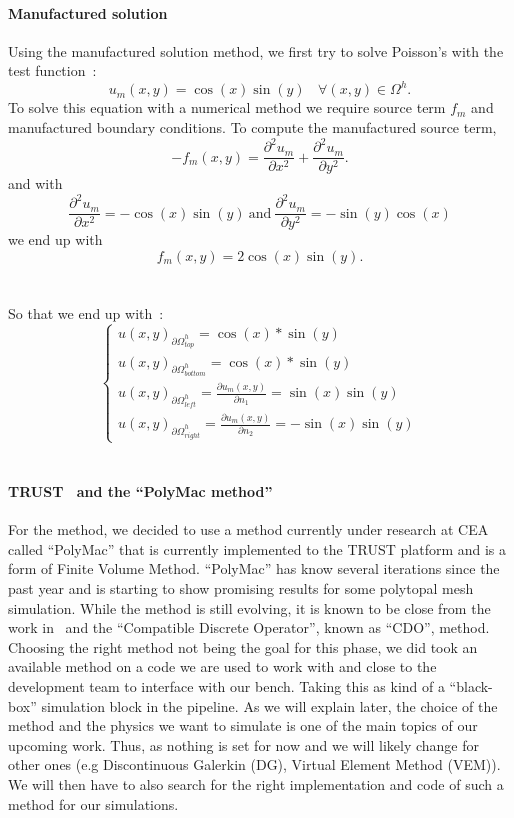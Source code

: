 \documentclass{article}
\begin{document}
\paragraph{Manufactured solution}
Using the manufactured solution method, we first try to solve Poisson's with the test function~:
\[
u_m(x,y) = \cos(x)\sin(y)~~~~\forall (x,y) \in \Omega^h.
\]
To solve this equation with a numerical method we require source term $f_m$ and manufactured boundary conditions. To compute the manufactured source term,
\[
- f_m(x,y) = \frac{{\partial^2 u_m}}{\partial x^2} + \frac{{\partial^2 u_m}}{\partial y^2}.
\]
and with
\[
\frac{{\partial^2 u_m}}{\partial x^2} = -\cos(x)\sin(y)~\text{and}~\frac{{\partial^2 u_m}}{\partial y^2} = -\sin(y)\cos(x)
\]
we end up with \\
\[
\boxed{f_m(x,y) = 2\cos(x)\sin(y)}.
\]
\\\\
So that we end up with~:
\[
\boxed{\begin{cases}
	u(x,y)_{{\partial\Omega}_{top}^h} = \cos(x)*\sin(y) \\
	u(x,y)_{{\partial\Omega}_{bottom}^h} = \cos(x)*\sin(y) \\
	u(x,y)_{{\partial\Omega}_{left}^h} = \frac{\partial u_m(x,y)}{\partial n_1} = \sin(x)\sin(y) \\
	u(x,y)_{{\partial\Omega}_{right}^h} = \frac{\partial u_m(x,y)}{\partial n_2} = -\sin(x)\sin(y)
\end{cases}}
\]\\


\paragraph{TRUST~\cite{CEA_TRUST} and the ``PolyMac method''}

For the method, we decided to use a method currently under research at CEA called ``PolyMac'' that is currently implemented to the TRUST platform and is a form of Finite Volume Method. ``PolyMac'' has know several iterations since the past year and is starting to show promising results for some polytopal mesh simulation. While the method is still evolving, it is known to be close from the work in~\cite{bonelle2018new} and the ``Compatible Discrete Operator'', known as ``CDO'', method. Choosing the right method not being the goal for this phase, we did took an available method on a code we are used to work with and close to the development team to interface with our bench. Taking this as kind of a ``black-box'' simulation block in the pipeline. As we will explain later, the choice of the method and the physics we want to simulate is one of the main topics of our upcoming work. Thus, as nothing is set for now and we will likely change for other ones (e.g Discontinuous Galerkin (DG), Virtual Element Method (VEM)). We will then have to also search for the right implementation and code of such a method for our simulations.
\end{document}

